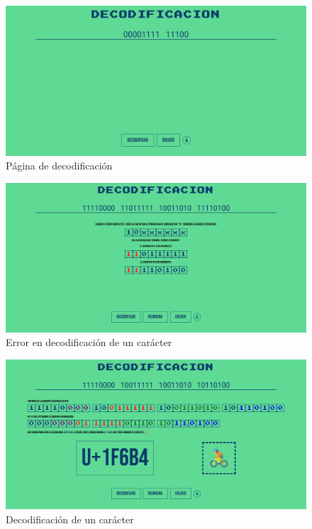\documentclass{article}
\begin{document}
\begin{figure}[h]
  \centering
  \includegraphics[width=1.0\textwidth]{decodificacion.png}
  \caption{Página de decodificación}
  \label{fig:decodificacion}
\end{figure}

\begin{figure}[h]
  \centering
  \includegraphics[width=1.0\textwidth]{decodificacion-ko.png}
  \caption{Error en decodificación de un carácter}
  \label{fig:decodificacion-ejemplo-ko}
\end{figure}

\begin{figure}[h]
  \centering
  \includegraphics[width=1.0\textwidth]{decodificacion-ok.png}
  \caption{Decodificación de un carácter}
  \label{fig:decodificacion-ejemplo-ok}
\end{figure}
\end{document}
